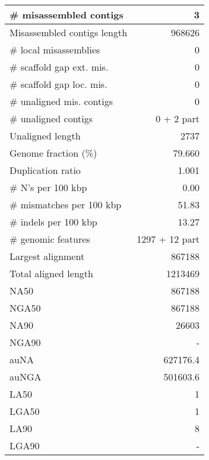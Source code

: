 \documentclass[12pt,a4paper]{article}
\begin{document}
\begin{table}[ht]
\begin{center}
\begin{tabular}{|l*{1}{|r}|}
\# misassembled contigs & 3 \\ \hline
Misassembled contigs length & 968626 \\ \hline
\# local misassemblies & 0 \\ \hline
\# scaffold gap ext. mis. & 0 \\ \hline
\# scaffold gap loc. mis. & 0 \\ \hline
\# unaligned mis. contigs & 0 \\ \hline
\# unaligned contigs & 0 + 2 part \\ \hline
Unaligned length & 2737 \\ \hline
Genome fraction (\%) & 79.660 \\ \hline
Duplication ratio & 1.001 \\ \hline
\# N's per 100 kbp & 0.00 \\ \hline
\# mismatches per 100 kbp & 51.83 \\ \hline
\# indels per 100 kbp & 13.27 \\ \hline
\# genomic features & 1297 + 12 part \\ \hline
Largest alignment & 867188 \\ \hline
Total aligned length & 1213469 \\ \hline
NA50 & 867188 \\ \hline
NGA50 & 867188 \\ \hline
NA90 & 26603 \\ \hline
NGA90 & - \\ \hline
auNA & 627176.4 \\ \hline
auNGA & 501603.6 \\ \hline
LA50 & 1 \\ \hline
LGA50 & 1 \\ \hline
LA90 & 8 \\ \hline
LGA90 & - \\ \hline
\end{tabular}
\end{center}
\end{table}
\end{document}
